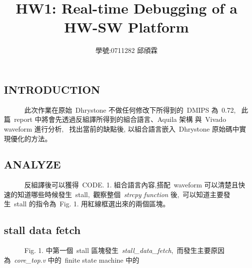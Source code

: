 \documentclass{article}
\title{\Large {HW1: Real-time Debugging of a HW-SW Platform}}
\author{學號:0711282 邱頎霖}
\date{}
\begin{document}
\begin{CJK*}{UTF8}{bsmi}
\setlength{\columnsep}{1cm}

\vspace*{-90pt}
    {\let\newpage\relax\maketitle}

\begin{multicols}{2}

\begin{center}
    \section*{INTRODUCTION}
\end{center}

\begin{flushleft}
    \ \ \ \ \ \ 此次作業在原始\ Dhrystone 不做任何修改下所得到的\ DMIPS 為\ 0.72, \
    此篇\ report 中將會先透過反組譯所得到的組合語言、Aquila 架構 與\ Vivado waveform 進行分析, \ 
    找出當前的缺點後, 以組合語言嵌入\ Dhrystone 原始碼中實現優化的方法。 
\end{flushleft}

\begin{center}
    \section*{ANALYZE}
\end{center}
\begin{flushleft}
    \ \ \ \ \ \ 反組譯後可以獲得\ CODE. 1. 組合語言內容,搭配\ waveform 可以清楚且快速的知道哪些時候發生\ stall,\
觀察整個\ \textit{strcpy function} 後,\
可以知道主要發生\ stall 的指令為\ Fig. 1. 用紅線框選出來的兩個區塊。\newline
\end{flushleft}

\begin{center}
    \subsection*{stall data fetch}
\end{center}
\begin{flushleft}
    \ \ \ \ \ \ Fig. 1. 中第一個\ stall 區塊發生\ \textit{stall\_data\_fetch},\ 
而發生主要原因為\ \textit{core\_top.v} 中的\ finite state machine 中的
\end{flushleft}


\end{multicols}
\end{CJK*}
\end{document}
